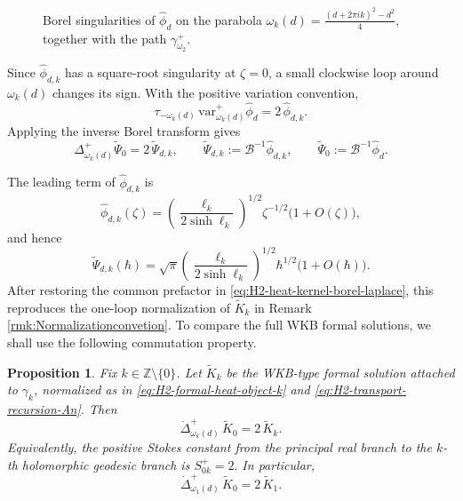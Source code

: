 \documentclass[11pt]{amsart}
\theoremstyle{plain}
\newtheorem{prop}[thm]{Proposition}
\theoremstyle{definition}
\newcommand{\Z}{\mathbb Z}
\newcommand{\var}{\text{var}}
\begin{document}
\begin{figure}[H]
{}
\caption{Borel singularities of $\widehat{\phi}_d$ on the parabola
$\omega_k(d)=\frac{(d+2\pi i k)^2-d^2}{4}$, together with the path
$\gamma_{\omega_2}^+$.}
\label{fig:hyperbolicsingularity}
\end{figure}


Since $\widehat\phi_{d,k}$ has a square-root singularity at
$\zeta=0$, a small clockwise loop around $\omega_k(d)$ changes its sign.
With the positive variation convention,
\begin{equation}\label{eq:H2-local-variation}
\tau_{-\omega_k(d)}\,
\var_{\omega_k(d)}^{+}\widehat\phi_d
=
2\,\widehat\phi_{d,k}.
\end{equation}
Applying the inverse Borel transform gives
\[
\Delta_{\omega_k(d)}^{+}\widetilde\Psi_0
=2\,\widetilde\Psi_{d,k},\qquad
\widetilde\Psi_{d,k}
:=\mathcal B^{-1}\widehat\phi_{d,k},
\qquad \widetilde\Psi_{0}
:=\mathcal B^{-1}\widehat\phi_{d}.
\]

The leading term of $\widehat\phi_{d,k}$ is
\[
\widehat\phi_{d,k}(\zeta)=\left(\frac{\ell_k}{2\sinh\ell_k}\right)^{1/2}\zeta^{-1/2}\bigl(1+O(\zeta)\bigr),
\]
and hence
\[
\widetilde\Psi_{d,k}(\hbar)
=\sqrt{\pi}\left(\frac{\ell_k}{2\sinh\ell_k}
\right)^{1/2}\hbar^{1/2}\bigl(1+O(\hbar)\bigr).
\]
After restoring the common prefactor in
\eqref{eq:H2-heat-kernel-borel-laplace}, this reproduces the one-loop
normalization of $\widetilde{K}_k$ in
Remark \ref{rmk:Normalizationconvetion}.  To compare the full WKB formal
solutions, we shall use the following commutation property.

\begin{prop}
\label{prop:H2-pointed-alien-stokes-constant}
Fix $k\in\Z\setminus\{0\}$.  Let
$\widetilde{K}_k$ be the WKB-type formal solution attached to
$\gamma_k$, normalized as in
\eqref{eq:H2-formal-heat-object-k} and \eqref{eq:H2-transport-recursion-An}.  Then
\[
\dot\Delta_{\omega_k(d)}^{+}\,
\widetilde{K}_0=2\,\widetilde{K}_k.
\]
Equivalently, the positive Stokes constant from the principal real branch to
the $k$-th holomorphic geodesic branch is
$
S_{0k}^{+}=2.
$ In particular,
\[
\dot\Delta_{\omega_1(d)}^{+}\,
\widetilde{K}_0=2\,\widetilde{K}_1.
\]
\end{prop}
\end{document}
